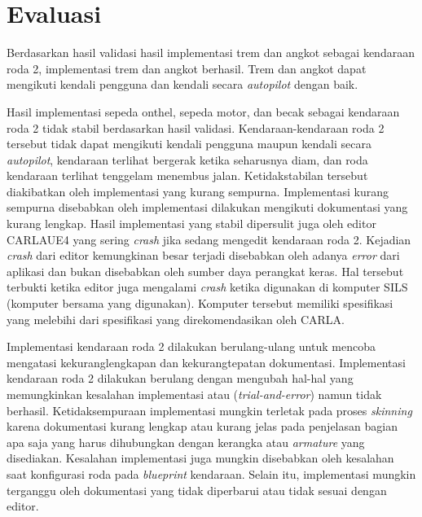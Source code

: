 \section{Evaluasi}

Berdasarkan hasil validasi hasil implementasi trem dan angkot sebagai kendaraan
roda 2, implementasi trem dan angkot berhasil. Trem dan angkot dapat mengikuti
kendali pengguna dan kendali secara \textit{autopilot} dengan baik.

Hasil implementasi sepeda onthel, sepeda motor, dan becak sebagai kendaraan roda
2 tidak stabil berdasarkan hasil validasi. Kendaraan-kendaraan roda 2 tersebut
tidak dapat mengikuti kendali pengguna maupun kendali secara \textit{autopilot},
kendaraan terlihat bergerak ketika seharusnya diam, dan roda kendaraan terlihat
tenggelam menembus jalan. Ketidakstabilan tersebut diakibatkan oleh implementasi
yang kurang sempurna. Implementasi kurang sempurna disebabkan oleh implementasi
dilakukan mengikuti dokumentasi yang kurang lengkap. Hasil implementasi yang
stabil dipersulit juga oleh editor CARLAUE4 yang sering \textit{crash} jika
sedang mengedit kendaraan roda 2. Kejadian \textit{crash} dari editor
kemungkinan besar terjadi disebabkan oleh adanya \textit{error} dari aplikasi
dan bukan disebabkan oleh sumber daya perangkat keras. Hal tersebut terbukti
ketika editor juga mengalami \textit{crash} ketika digunakan di komputer SILS
(komputer bersama yang digunakan). Komputer tersebut memiliki spesifikasi yang
melebihi dari spesifikasi yang direkomendasikan oleh CARLA.

Implementasi kendaraan roda 2 dilakukan berulang-ulang untuk mencoba mengatasi
kekuranglengkapan dan kekurangtepatan dokumentasi. Implementasi kendaraan roda 2
dilakukan berulang dengan mengubah hal-hal yang memungkinkan kesalahan
implementasi atau (\textit{trial-and-error}) namun tidak berhasil.
Ketidaksempuraan implementasi mungkin terletak pada proses \textit{skinning}
karena dokumentasi kurang lengkap atau kurang jelas pada penjelasan bagian apa
saja yang harus dihubungkan dengan kerangka atau \textit{armature} yang
disediakan. Kesalahan implementasi juga mungkin disebabkan oleh kesalahan saat
konfigurasi roda pada \textit{blueprint} kendaraan. Selain itu, implementasi
mungkin terganggu oleh dokumentasi yang tidak diperbarui atau tidak sesuai
dengan editor.


